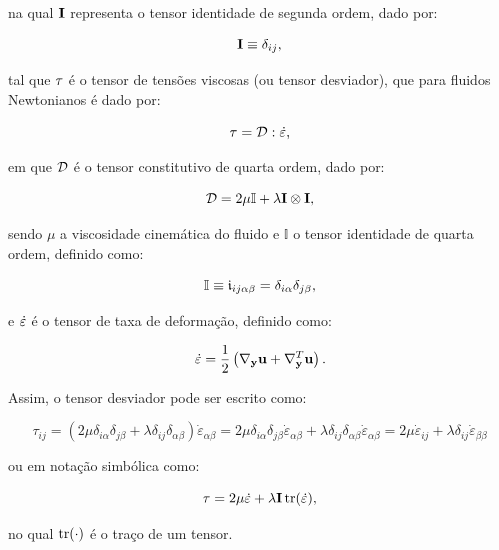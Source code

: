 \documentclass[_ArquivoPrincipal.tex]{subfiles}
\begin{document}
\noindent na qual $\mathbf{I}$ representa o tensor identidade de segunda ordem, dado por:

\begin{equation}
    \mathbf{I}\equiv\delta_{ij}\text{,}
\end{equation}

\noindent tal que $\mathbf{\tau}$ é o tensor de tensões viscosas (ou tensor desviador), que para fluidos Newtonianos é dado por:

\begin{equation}
    \mathbf{\tau}=\mathcal{D}:\dot{\mathbf{\varepsilon}}\text{,}
\end{equation}

\noindent em que $\mathcal{D}$ é o tensor constitutivo de quarta ordem, dado por:

\begin{equation}
    \mathcal{D}=2\mu\mathbb{I}+\lambda\mathbf{I}\otimes\mathbf{I}\text{,}
\end{equation}

\noindent sendo $\mu$ a viscosidade cinemática do fluido e $\mathbb{I}$ o tensor identidade de quarta ordem, definido como:

\begin{equation}
    \mathbb{I}\equiv\frak{i}_{ij\alpha\beta}=\delta_{i\alpha}\delta_{j\beta}\text{,}
\end{equation}

\noindent e $\dot{\mathbf{\varepsilon}}$ é o tensor de taxa de deformação, definido como:

\begin{equation}
    \dot{\mathbf{\varepsilon}}=\frac{1}{2}\left(\mathbf{\nabla_y}\mathbf{u}+\mathbf{\nabla}^T_\mathbf{y}\mathbf{u}\right)\text{.}\label{eq:deftax1}
\end{equation}

Assim, o tensor desviador pode ser escrito como:

\[\tau_{ij}=(2\mu\delta_{i\alpha}\delta_{j\beta}+\lambda\delta_{ij}\delta_{\alpha\beta})\dot{\varepsilon}_{\alpha\beta}=2\mu\delta_{i\alpha}\delta_{j\beta}\dot{\varepsilon}_{\alpha\beta}+\lambda\delta_{ij}\delta_{\alpha\beta}\dot{\varepsilon}_{\alpha\beta}=2\mu\dot{\varepsilon}_{ij}+\lambda\delta_{ij}\dot{\varepsilon}_{\beta\beta}\]

\noindent ou em notação simbólica como:

\begin{equation}
    \mathbf{\tau}=2\mu\dot{\mathbf{\varepsilon}}+\lambda\mathbf{I}\mathop{\mathrm{tr}}\nolimits(\dot{\mathbf{\varepsilon}})\text{,}
\end{equation}

\noindent no qual $\mathop{\mathrm{tr}}\nolimits(\cdot)$ é o traço de um tensor.
\end{document}
